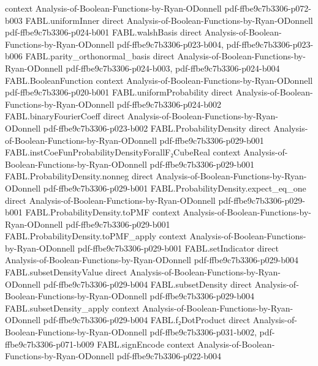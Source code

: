 \begin{theorem}
  {context}
  {Analysis-of-Boolean-Functions-by-Ryan-ODonnell}
  {pdf-ffbe9c7b3306-p072-b003}
\proofstep
  {FABL.uniformInner}
  {direct}
  {Analysis-of-Boolean-Functions-by-Ryan-ODonnell}
  {pdf-ffbe9c7b3306-p024-b001}
\proofstep
  {FABL.walshBasis}
  {direct}
  {Analysis-of-Boolean-Functions-by-Ryan-ODonnell}
  {pdf-ffbe9c7b3306-p023-b004,
    pdf-ffbe9c7b3306-p023-b006}
\proofstep
  {FABL.parity_orthonormal_basis}
  {direct}
  {Analysis-of-Boolean-Functions-by-Ryan-ODonnell}
  {pdf-ffbe9c7b3306-p024-b003,
    pdf-ffbe9c7b3306-p024-b004}
\proofstep
  {FABL.BooleanFunction}
  {context}
  {Analysis-of-Boolean-Functions-by-Ryan-ODonnell}
  {pdf-ffbe9c7b3306-p020-b001}
\proofstep
  {FABL.uniformProbability}
  {direct}
  {Analysis-of-Boolean-Functions-by-Ryan-ODonnell}
  {pdf-ffbe9c7b3306-p024-b002}
\proofstep
  {FABL.binaryFourierCoeff}
  {direct}
  {Analysis-of-Boolean-Functions-by-Ryan-ODonnell}
  {pdf-ffbe9c7b3306-p023-b002}
\proofstep
  {FABL.ProbabilityDensity}
  {direct}
  {Analysis-of-Boolean-Functions-by-Ryan-ODonnell}
  {pdf-ffbe9c7b3306-p029-b001}
\proofstep
  {FABL.instCoeFunProbabilityDensityForallF₂CubeReal}
  {context}
  {Analysis-of-Boolean-Functions-by-Ryan-ODonnell}
  {pdf-ffbe9c7b3306-p029-b001}
\proofstep
  {FABL.ProbabilityDensity.nonneg}
  {direct}
  {Analysis-of-Boolean-Functions-by-Ryan-ODonnell}
  {pdf-ffbe9c7b3306-p029-b001}
\proofstep
  {FABL.ProbabilityDensity.expect_eq_one}
  {direct}
  {Analysis-of-Boolean-Functions-by-Ryan-ODonnell}
  {pdf-ffbe9c7b3306-p029-b001}
\proofstep
  {FABL.ProbabilityDensity.toPMF}
  {context}
  {Analysis-of-Boolean-Functions-by-Ryan-ODonnell}
  {pdf-ffbe9c7b3306-p029-b001}
\proofstep
  {FABL.ProbabilityDensity.toPMF_apply}
  {context}
  {Analysis-of-Boolean-Functions-by-Ryan-ODonnell}
  {pdf-ffbe9c7b3306-p029-b001}
\proofstep
  {FABL.setIndicator}
  {direct}
  {Analysis-of-Boolean-Functions-by-Ryan-ODonnell}
  {pdf-ffbe9c7b3306-p029-b004}
\proofstep
  {FABL.subsetDensityValue}
  {direct}
  {Analysis-of-Boolean-Functions-by-Ryan-ODonnell}
  {pdf-ffbe9c7b3306-p029-b004}
\proofstep
  {FABL.subsetDensity}
  {direct}
  {Analysis-of-Boolean-Functions-by-Ryan-ODonnell}
  {pdf-ffbe9c7b3306-p029-b004}
\proofstep
  {FABL.subsetDensity_apply}
  {context}
  {Analysis-of-Boolean-Functions-by-Ryan-ODonnell}
  {pdf-ffbe9c7b3306-p029-b004}
\proofstep
  {FABL.f₂DotProduct}
  {direct}
  {Analysis-of-Boolean-Functions-by-Ryan-ODonnell}
  {pdf-ffbe9c7b3306-p031-b002,
    pdf-ffbe9c7b3306-p071-b009}
\proofstep
  {FABL.signEncode}
  {context}
  {Analysis-of-Boolean-Functions-by-Ryan-ODonnell}
  {pdf-ffbe9c7b3306-p022-b004}

\end{theorem}

